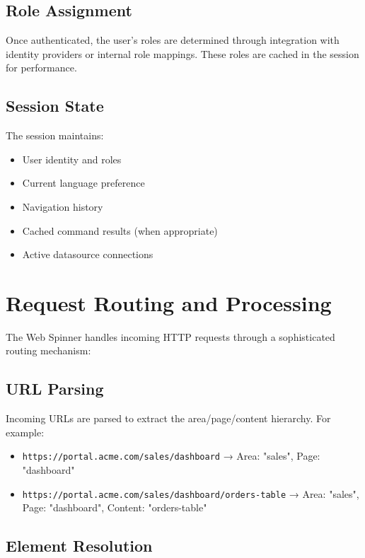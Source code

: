 \subsection{Role Assignment}

Once authenticated, the user's roles are determined through integration with identity providers or internal role mappings. These roles are cached in the session for performance.

\subsection{Session State}

The session maintains:
\begin{itemize}
	\item User identity and roles
	\item Current language preference
	\item Navigation history
	\item Cached command results (when appropriate)
	\item Active datasource connections
\end{itemize}

\section{Request Routing and Processing}
\label{sec:request-routing}

The Web Spinner handles incoming HTTP requests through a sophisticated routing mechanism:

\subsection{URL Parsing}

Incoming URLs are parsed to extract the area/page/content hierarchy. For example:
\begin{itemize}
	\item \texttt{https://portal.acme.com/sales/dashboard} → Area: "sales", Page: "dashboard"
	\item \texttt{https://portal.acme.com/sales/dashboard/orders-table} → Area: "sales", Page: "dashboard", Content: "orders-table"
\end{itemize}

\subsection{Element Resolution}

